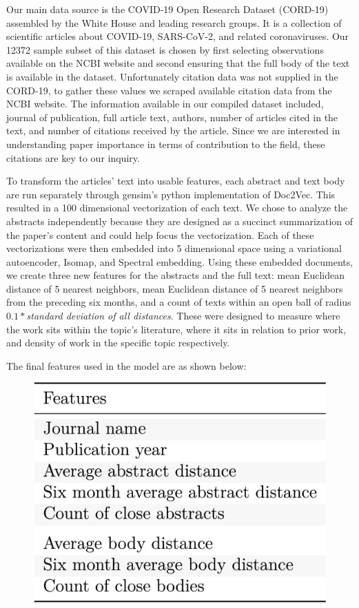 \documentclass{article} %
\begin{document}
Our main data source is the COVID-19 Open Research Dataset (CORD-19) assembled by the White House and leading research groups. It is a collection of scientific articles about COVID-19, SARS-CoV-2, and related coronaviruses. Our 12372 sample subset of this dataset is chosen by first selecting observations available on the NCBI website and second ensuring that the full body of the text is available in the dataset. Unfortunately citation data was not supplied in the CORD-19, to gather these values we scraped available citation data from the NCBI website. The information available in our compiled dataset included, journal of publication, full article text, authors, number of articles cited in the text, and number of citations received by the article. Since we are interested in understanding paper importance in terms of contribution to the field, these citations are key to our inquiry.

To transform the articles' text into usable features, each abstract and text body are run separately through gensim's python implementation of Doc2Vec. This resulted in a 100 dimensional vectorization of each text. We chose to analyze the abstracts independently because they are designed as a succinct summarization of the paper's content and could help focus the vectorization. Each of these vectorizations were then embedded into 5 dimensional space using a variational autoencoder, Isomap, and Spectral embedding. Using these embedded documents, we create three new features for the abstracts and the full text: mean Euclidean distance of 5 nearest neighbors, mean Euclidean distance of 5 nearest neighbors from the preceding six months, and a count of texts within an open ball of radius $0.1 * $\textit{standard deviation of all distances}. These were designed to measure where the work sits within the topic's literature, where it sits in relation to prior work, and density of work in the specific topic respectively. 

The final features used in the model are as shown below:


\begin{figure}[h]
\begin{center}
\includegraphics[scale=0.17]{../Figures/features.png} 
\end{center}
\end{figure}
\end{document}
